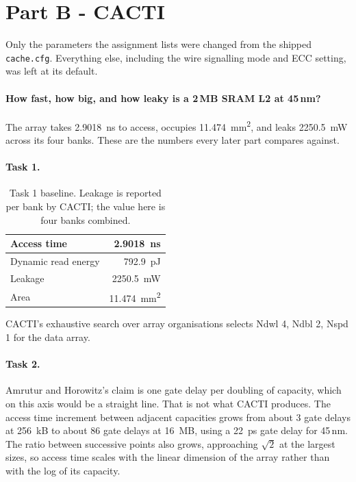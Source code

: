 \documentclass[9pt,a4paper]{extarticle}
\begin{document}
\section{Part B - CACTI}
\label{sec:b}

Only the parameters the assignment lists were changed from the shipped
\texttt{cache.cfg}. Everything else, including the wire signalling mode
and ECC setting, was left at its default.

\paragraph{How fast, how big, and how leaky is a 2\,MB SRAM L2 at
45\,nm?}

The array takes \SI{2.9018}{ns} to access, occupies \SI{11.474}{mm^2}, and
leaks \SI{2250.5}{mW} across its four banks. These are the numbers every
later part compares against.

\paragraph{Task 1.}

\begin{table}[!ht]\centering\small
\caption{Task 1 baseline. Leakage is reported per bank by CACTI; the
value here is four banks combined.}
\label{tab:b1}
\begin{tabular}{|l|r|}
\hline
Access time & \SI{2.9018}{ns} \\
\hline
Dynamic read energy & \SI{792.9}{pJ} \\
\hline
Leakage & \SI{2250.5}{mW} \\
\hline
Area & \SI{11.474}{mm^2} \\
\hline
\end{tabular}
\end{table}

CACTI's exhaustive search over array organisations selects Ndwl 4, Ndbl 2,
Nspd 1 for the data array.

\paragraph{Task 2.}

Amrutur and Horowitz's claim is one gate delay per doubling of capacity,
which on this axis would be a straight line. That is not what CACTI
produces. The access time increment between adjacent capacities grows
from about 3 gate delays at \SI{256}{kB} to about 86 gate delays at
\SI{16}{MB}, using a \SI{22}{ps} gate delay for 45\,nm. The ratio between
successive points also grows, approaching $\sqrt{2}$ at the largest
sizes, so access time scales with the linear dimension of the array
rather than with the log of its capacity.
\end{document}

